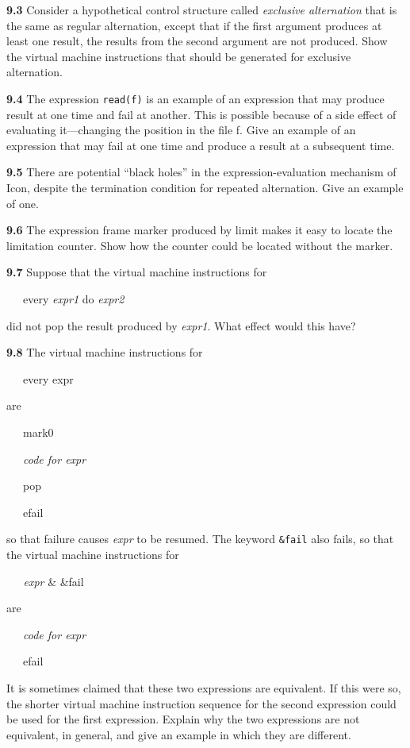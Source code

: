 \textbf{9.3} Consider a hypothetical control structure called
\textit{exclusive alternation} that is the same as regular
alternation, except that if the first argument produces at least one
result, the results from the second argument are not produced. Show
the virtual machine instructions that should be generated for
exclusive alternation.

\textbf{9.4} The expression \texttt{read(f)} is an example of an expression
that may produce result at one time and fail at another. This is
possible because of a side effect of evaluating it---changing the
position in the file f. Give an example of an expression that may fail
at one time and produce a result at a subsequent time.

\textbf{9.5} There are potential ``black holes'' in
the expression-evaluation mechanism of Icon, despite the termination
condition for repeated alternation. Give an example of one.

\textbf{9.6} The expression frame marker produced by limit makes it easy to
locate the limitation counter. Show how the counter could be located
without the marker.

\textbf{9.7} Suppose that the virtual machine instructions for

{\ttfamily\mdseries
\ \ \ every \textit{expr1} do \textit{expr2}}

\noindent did not pop the result produced by \textit{expr1}. What
effect would this have?

\textbf{9.8} The virtual machine instructions for

{\ttfamily\mdseries
\ \ \ every expr}

are

{\ttfamily\mdseries
\ \ \ mark0}

{\ttfamily\mdseries
\ \ \ \textit{code for expr}}

{\ttfamily\mdseries
\ \ \ pop}

{\ttfamily\mdseries
\ \ \ efail}

\noindent so that failure causes \textit{expr} to be resumed. The
keyword \texttt{\&fail} also fails, so that the virtual machine
instructions for

{\ttfamily\mdseries
\textit{\ \ \ expr }\& \&fail}

are

{\ttfamily\mdseries
\ \ \ \textit{code for expr}}

{\ttfamily\mdseries
\ \ \ efail}

It is sometimes claimed that these two expressions are equivalent. If
this were so, the shorter virtual machine instruction sequence for the
second expression could be used for the first expression. Explain why
the two expressions are not equivalent, in general, and give an
example in which they are different.

